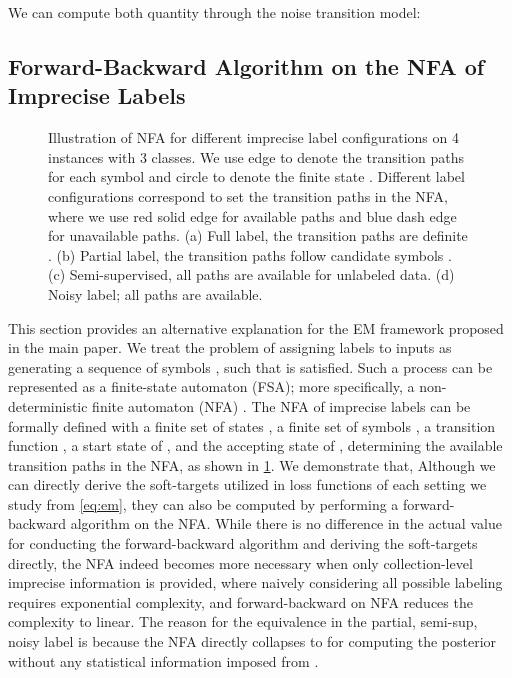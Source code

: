 We can compute both quantity through the noise transition model:




\subsection{Forward-Backward Algorithm on the NFA of Imprecise Labels}
\label{sec-append-nfa}

\begin{figure}[t]
    \centering
    \hfill
    \hfill
    \hfill
    \hfill
    \hfill
    \caption{Illustration of NFA for different imprecise label configurations on 4 instances with 3 classes. We use edge to denote the transition paths for each symbol  and circle to denote the finite state . Different label configurations  correspond to set the transition paths in the NFA, where we use red solid edge for available paths and blue dash edge for unavailable paths.  (a) Full label, the transition paths are definite . (b) Partial label, the transition paths follow candidate symbols . (c) Semi-supervised, all paths are available for unlabeled data. (d) Noisy label; all paths are available. 
}
    \label{fig:nfa}
\vspace{-0.15in}
\end{figure}

This section provides an alternative explanation for the EM framework proposed in the main paper.  We treat the problem of assigning labels  to inputs  as generating a sequence of symbols , such that  is satisfied.
Such a process can be represented as a finite-state automaton (FSA); more specifically, a non-deterministic finite automaton (NFA) \citep{hopcroft2001introduction}. 
The NFA of imprecise labels can be formally defined with a finite set of states , a finite set of symbols , a transition function , a start state of , and the accepting state of , determining the available transition paths in the NFA, as shown in \cref{fig:nfa}.
We demonstrate that, Although we can directly derive the soft-targets utilized in loss functions of each setting we study from \cref{eq:em}, they can also be computed by performing a forward-backward algorithm on the NFA.
While there is no difference in the actual value for conducting the forward-backward algorithm and deriving the soft-targets directly, the NFA indeed becomes more necessary when only collection-level imprecise information is provided, where naively considering all possible labeling requires exponential complexity, and forward-backward on NFA reduces the complexity to linear. 
The reason for the equivalence in the partial, semi-sup, noisy label is because the NFA directly collapses to  for computing the posterior without any statistical information imposed from . 

